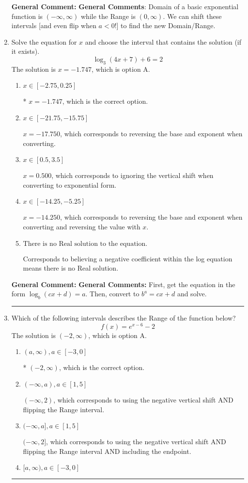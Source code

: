 \documentclass{extbook}[14pt]
\newcommand{\litem}[1]{\item #1

\rule{\textwidth}{0.4pt}}
\begin{document}
\begin{enumerate}
{\textbf{General Comment:} \textbf{General Comments}: Domain of a basic exponential function is $(-\infty, \infty)$ while the Range is $(0, \infty)$. We can shift these intervals [and even flip when $a<0$!] to find the new Domain/Range.
}
\litem{
Solve the equation for $x$ and choose the interval that contains the solution (if it exists).
\[ \log_{3}{(4x+7)}+6 = 2 \]The solution is \( x = -1.747 \), which is option A.\begin{enumerate}[label=\Alph*.]
\item \( x \in [-2.75, 0.25] \)

* $x = -1.747$, which is the correct option.
\item \( x \in [-21.75, -15.75] \)

$x = -17.750$, which corresponds to reversing the base and exponent when converting.
\item \( x \in [0.5, 3.5] \)

$x = 0.500$, which corresponds to ignoring the vertical shift when converting to exponential form.
\item \( x \in [-14.25, -5.25] \)

$x = -14.250$, which corresponds to reversing the base and exponent when converting and reversing the value with $x$.
\item \( \text{There is no Real solution to the equation.} \)

Corresponds to believing a negative coefficient within the log equation means there is no Real solution.
\end{enumerate}

\textbf{General Comment:} \textbf{General Comments:} First, get the equation in the form $\log_b{(cx+d)} = a$. Then, convert to $b^a = cx+d$ and solve.
}
\litem{
Which of the following intervals describes the Range of the function below?
\[ f(x) = e^{x-6}-2 \]The solution is \( (-2, \infty) \), which is option A.\begin{enumerate}[label=\Alph*.]
\item \( (a, \infty), a \in [-3, 0] \)

* $(-2, \infty)$, which is the correct option.
\item \( (-\infty, a), a \in [1, 5] \)

$(-\infty, 2)$, which corresponds to using the negative vertical shift AND flipping the Range interval.
\item \( (-\infty, a], a \in [1, 5] \)

$(-\infty, 2]$, which corresponds to using the negative vertical shift AND flipping the Range interval AND including the endpoint.
\item \( [a, \infty), a \in [-3, 0] \)


\end{enumerate}}
\end{enumerate}
\end{document}
